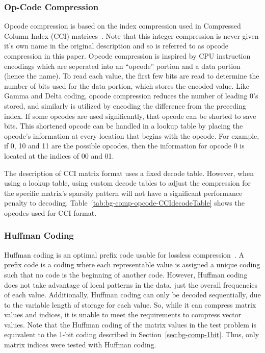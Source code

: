 \subsubsection{Op-Code Compression}
\label{sec:bg-comp-opcode}
Opcode compression is based on the index compression used in Compressed Column Index (CCI) matrices~\cite{Lawlor:2013:compression}.
Note that this integer compression is never given it's own name in the original description and so is referred to as opcode compression in this paper.
Opcode compression is inspired by CPU instruction encodings which are seperated into an ``opcode'' portion and a data portion (hence the name).
To read each value, the first few bits are read to determine the number of bits used for the data portion, which stores the encoded value.
Like Gamma and Delta coding, opcode compression reduces the number of leading 0's stored, and similarly is utilized by encoding the difference from the preceding index.
If some opcodes are used significantly, that opcode can be shorted to save bits.
This shortened opcode can be handled in a lookup table by placing the opcode's information at every location that begins with the opcode.
For example, if 0, 10 and 11 are the possible opcodes, then the information for opcode 0 is located at the indices of 00 and 01.

The description of CCI matrix format uses a fixed decode table.
However, when using a lookup table, using custom decode tables to adjust the compression for the specific matrix's sparsity pattern will not have a significant performance penalty to decoding.
Table~\ref{tab:bg-comp-opcode-CCIdecodeTable} shows the opcodes used for CCI format.



\subsubsection{Huffman Coding}
\label{sec:bg-comp-huffman}
Huffman coding is an optimal prefix code usable for lossless compression~\cite{Huffman:1952:coding}.
A prefix code is a coding where each representable value is assigned a unique coding such that no code is the beginning of another code.
However, Huffman coding does not take advantage of local patterns in the data, just the overall frequencies of each value.
Additionally, Huffman coding can only be decoded sequentially, due to the variable length of storage for each value.
So, while it can compress matrix values and indices, it is unable to meet the requirements to compress vector values.
Note that the Huffman coding of the matrix values in the test problem is equivalent to the 1-bit coding described in Section~\ref{sec:bg-comp-1bit}.
Thus, only matrix indices were tested with Huffman coding.

